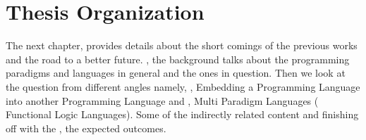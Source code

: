 \documentclass[thesis-solanki.tex]{subfiles}
\begin{document}
%






\section{Thesis Organization}

The next chapter,  provides details about the short comings of the previous works and the road to a 
better future. , the background talks about the programming paradigms and languages in general and 
the ones in question. Then we look at the question from different angles namely, ,  Embedding a 
Programming Language into another Programming Language and  , Multi Paradigm Languages (
Functional Logic Languages). Some of the indirectly related content  and finishing off with the 
, the expected outcomes.     

\end{document}
